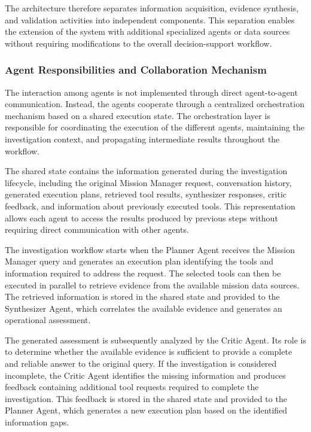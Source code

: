 The architecture therefore separates information acquisition, evidence synthesis, and validation activities into independent components. This separation enables the extension of the system with additional specialized agents or data sources without requiring modifications to the overall decision-support workflow.


\subsubsection{Agent Responsibilities and Collaboration Mechanism}

The interaction among agents is not implemented through direct agent-to-agent communication. Instead, the agents cooperate through a centralized orchestration mechanism based on a shared execution state. The orchestration layer is responsible for coordinating the execution of the different agents, maintaining the investigation context, and propagating intermediate results throughout the workflow.

The shared state contains the information generated during the investigation lifecycle, including the original Mission Manager request, conversation history, generated execution plans, retrieved tool results, synthesizer responses, critic feedback, and information about previously executed tools. This representation allows each agent to access the results produced by previous steps without requiring direct communication with other agents.

The investigation workflow starts when the Planner Agent receives the Mission Manager query and generates an execution plan identifying the tools and information required to address the request. The selected tools can then be executed in parallel to retrieve evidence from the available mission data sources. The retrieved information is stored in the shared state and provided to the Synthesizer Agent, which correlates the available evidence and generates an operational assessment.

The generated assessment is subsequently analyzed by the Critic Agent. Its role is to determine whether the available evidence is sufficient to provide a complete and reliable answer to the original query. If the investigation is considered incomplete, the Critic Agent identifies the missing information and produces feedback containing additional tool requests required to complete the investigation. This feedback is stored in the shared state and provided to the Planner Agent, which generates a new execution plan based on the identified information gaps.

